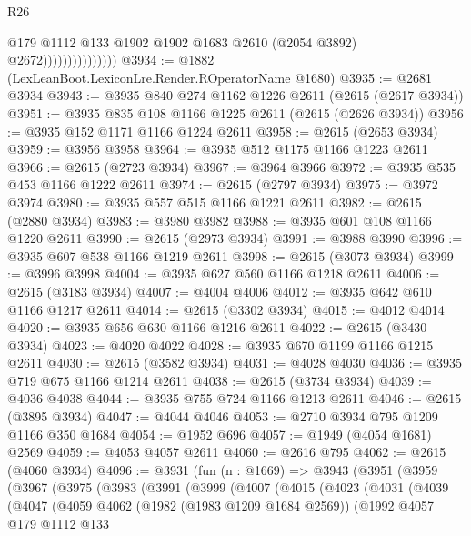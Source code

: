 \begin{lexlean}{R26}
\begin{coremodule}
                                  @179
                                  @1112
                                  @133
                                  @1902
                                  @1902
                                  @1683
                                  @2610
                                  (@2054 @3892)
                                  @2672)))))))))))))))
@3934 := @1882 (LexLeanBoot.LexiconLre.Render.ROperatorName @1680)
@3935 := @2681 @3934
@3943 := @3935 @840 @274 @1162 @1226 @2611 (@2615 (@2617 @3934))
@3951 := @3935 @835 @108 @1166 @1225 @2611 (@2615 (@2626 @3934))
@3956 := @3935 @152 @1171 @1166 @1224 @2611
@3958 := @2615 (@2653 @3934)
@3959 := @3956 @3958
@3964 := @3935 @512 @1175 @1166 @1223 @2611
@3966 := @2615 (@2723 @3934)
@3967 := @3964 @3966
@3972 := @3935 @535 @453 @1166 @1222 @2611
@3974 := @2615 (@2797 @3934)
@3975 := @3972 @3974
@3980 := @3935 @557 @515 @1166 @1221 @2611
@3982 := @2615 (@2880 @3934)
@3983 := @3980 @3982
@3988 := @3935 @601 @108 @1166 @1220 @2611
@3990 := @2615 (@2973 @3934)
@3991 := @3988 @3990
@3996 := @3935 @607 @538 @1166 @1219 @2611
@3998 := @2615 (@3073 @3934)
@3999 := @3996 @3998
@4004 := @3935 @627 @560 @1166 @1218 @2611
@4006 := @2615 (@3183 @3934)
@4007 := @4004 @4006
@4012 := @3935 @642 @610 @1166 @1217 @2611
@4014 := @2615 (@3302 @3934)
@4015 := @4012 @4014
@4020 := @3935 @656 @630 @1166 @1216 @2611
@4022 := @2615 (@3430 @3934)
@4023 := @4020 @4022
@4028 := @3935 @670 @1199 @1166 @1215 @2611
@4030 := @2615 (@3582 @3934)
@4031 := @4028 @4030
@4036 := @3935 @719 @675 @1166 @1214 @2611
@4038 := @2615 (@3734 @3934)
@4039 := @4036 @4038
@4044 := @3935 @755 @724 @1166 @1213 @2611
@4046 := @2615 (@3895 @3934)
@4047 := @4044 @4046
@4053 := @2710 @3934 @795 @1209 @1166 @350 @1684
@4054 := @1952 @696
@4057 := @1949 (@4054 @1681) @2569
@4059 := @4053 @4057 @2611
@4060 := @2616 @795
@4062 := @2615 (@4060 @3934)
@4096 := @3931
    (fun (n : @1669) =>
    @3943
      (@3951
        (@3959
          (@3967
            (@3975
              (@3983
                (@3991
                  (@3999
                    (@4007
                      (@4015
                        (@4023
                          (@4031
                            (@4039
                              (@4047
                                (@4059
                                  @4062
                                  (@1982 (@1983 @1209 @1684 @2569))
                                  (@1992
                                    @4057
                                    @179
                                    @1112
                                    @133

\end{coremodule}
\end{lexlean}
